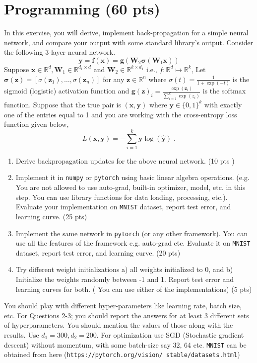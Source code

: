 \documentclass[a4paper]{article}
\theoremstyle{definition}
\renewcommand\vec[1]{\boldsymbol{#1}}
\def\R{\mathbb R}
\begin{document}
\section{Programming (60 pts)}
In this exercise, you will derive, implement back-propagation for a simple neural network, and compare your output with some standard library’s output. Consider the following 3-layer neural network. 
\[\vec y = \vec f(\vec x) = \vec g(\vec W_2 \vec \sigma (\vec W_1 \vec x))\] 
Suppose $\vec x \in \R^d,\vec W_1 \in \R^{d_1\times d}$ and $\vec W_2 \in \R^{k\times d_1}$ i.e., $f : \R^d\mapsto \R^k$, Let $\vec \sigma (\vec z) = [\sigma(\vec z_1), \ldots , \sigma(\vec z_n)]$ for any $\vec z\in \R^n$ where $\sigma(t)=\frac{1}{1+\exp(-t)}$ is the sigmoid (logistic) activation function and $\vec g(\vec z)_i = \frac{\exp(\vec z_i)}{\sum_{i=1}^k  \exp(z_i)}$ is the softmax
function. Suppose that the true pair is $(\vec x, \vec y)$ where $\vec y \in \{0, 1\}^k$ with exactly one of the entries equal to 1 and you are working with the cross-entropy loss function given below, 
\[
L(\vec x,\vec y) = -\sum_{i=1}^k 
\vec y \log (\hat{\vec y})\;. 
\]
\begin{enumerate}
    \item Derive backpropagation updates for the above neural network. (10 pts )
    \item Implement it in {\tt numpy} or {\tt pytorch} using basic linear algebra operations. (e.g. You are not allowed to use auto-grad, built-in optimizer, model, etc. in this step. You can use library functions for data loading, processing, etc.). Evaluate your implementation on {\tt MNIST} dataset, report test error, and learning curve. (25 pts) 
    \item  Implement the same network in {\tt pytorch} (or any other framework). You can use all the features of the framework e.g. auto-grad etc. Evaluate it on {\tt MNIST} dataset, report test error, and learning curve. (20 pts) 
    \item Try different weight initializations a) all weights initialized to 0, and b) Initialize the weights randomly between -1 and 1. Report test error and learning curves for both. ( You can use either of the implementations) (5 pts)
\end{enumerate}
You should play with different hyper-parameters like learning rate, batch size, etc. For Questions 2-3; you should report the answers for at least 3 different sets of hyperparameters. You should mention the values of those along with the results. Use $d_1 = 300, d_2 = 200$. For optimization use SGD (Stochastic gradient descent) without momentum, with some batch-size say 32, 64 etc. {\tt MNIST} can be obtained from here ({\tt https://{\tt pytorch}.org/vision/ stable/datasets.html}) 
\end{document}
